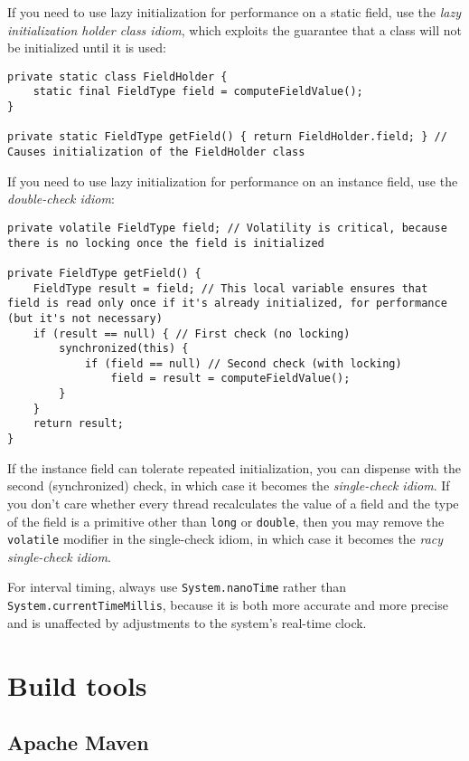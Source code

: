 \documentclass[8pt, table, xcdraw]{article}%
\begin{document}
If you need to use lazy initialization for performance on a static field, use the \emph{lazy initialization holder class idiom}, which exploits the guarantee that a class will not be initialized until it is used:

\begin{lstlisting}
private static class FieldHolder {
    static final FieldType field = computeFieldValue();
}

private static FieldType getField() { return FieldHolder.field; } // Causes initialization of the FieldHolder class
\end{lstlisting}

If you need to use lazy initialization for performance on an instance field, use the \emph{double-check idiom}:

\begin{lstlisting}
private volatile FieldType field; // Volatility is critical, because there is no locking once the field is initialized

private FieldType getField() {
    FieldType result = field; // This local variable ensures that field is read only once if it's already initialized, for performance (but it's not necessary)
    if (result == null) { // First check (no locking)
        synchronized(this) {
            if (field == null) // Second check (with locking)
                field = result = computeFieldValue();
        }
    }
    return result;
}
\end{lstlisting}

If the instance field can tolerate repeated initialization, you can dispense with the second (synchronized) check, in which case it becomes the \emph{single-check idiom}. If you don’t care whether every thread recalculates the value of a field and the type of the field is a primitive other than \lstinline{long} or \lstinline{double}, then you may remove the \lstinline{volatile} modifier in the single-check idiom, in which case it becomes the \emph{racy single-check idiom}.

For interval timing, always use \lstinline{System.nanoTime} rather than \lstinline{System.currentTimeMillis}, because it is both more accurate and more precise and is unaffected by adjustments to the system’s real-time clock.

\section{Build tools}

\subsection{Apache Maven}
\end{document}
